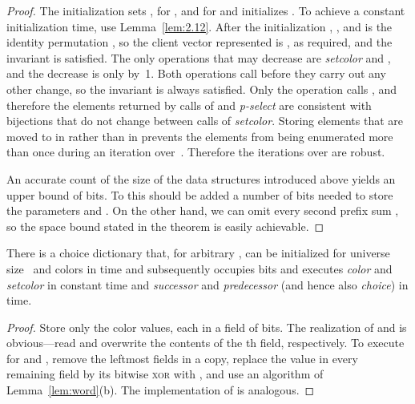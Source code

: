 \documentclass[envcountsame,envcountsect,undated,nolinenumbers]{lnthi}
\def\Fpasteinsection#1{#1
}
\def\Tvn#1{\hbox{\textit{#1\/}}}
\begin{document}
\begin{proof}
The initialization
sets ,
 for ,
 and  for 
and initializes .
To achieve a constant
initialization time, use Lemma~\ref{lem:2.12}.
After the initialization ,
,
 and  is the identity permutation ,
so the client vector represented is
,
as required, and the invariant is satisfied.
The only operations that may decrease 
are \Tvn{setcolor} and ,
and the decrease is only by~1.
Both operations call
 before they carry out any
other change, so
the invariant  is always satisfied.
Only the operation 
calls , and therefore the elements
returned by calls of  and
\Tvn{p-select} are consistent
with bijections that do not change between
calls of \Tvn{setcolor}.
Storing elements that are moved to 
in  rather than in 
prevents the elements from being enumerated
more than once during an iteration over~.
Therefore the iterations over  are robust.

An accurate count of the size of the data
structures introduced above yields an upper bound of
 bits.
To this should be added a number of bits needed
to store the parameters  and .
On the other hand, we can omit every second
prefix sum , so the space bound stated
in the theorem is easily achievable.
\end{proof}

\begin{lemma}
\label{lem:atomic-c}There is a choice dictionary that, for arbitrary
, can be initialized for universe size~
and  colors in  time
and subsequently occupies 
bits and executes \Tvn{color} and \Tvn{setcolor}
in constant time and \Tvn{successor} and
\Tvn{predecessor} (and hence also \Tvn{choice})
in  time.
\end{lemma}

\begin{proof}
Store only the  color values, each in a
field of  bits.
The realization of  and
 is obvious---read and overwrite
the contents of the th field,
respectively.
To execute  for
 and ,
remove the  leftmost fields in a copy, replace
the value in
every remaining field by its bitwise
\textsc{xor} with , and use an algorithm
of Lemma~\ref{lem:word}(b).
The implementation of  is
analogous.
\end{proof}

\Fpasteinsection{}
\end{document}
